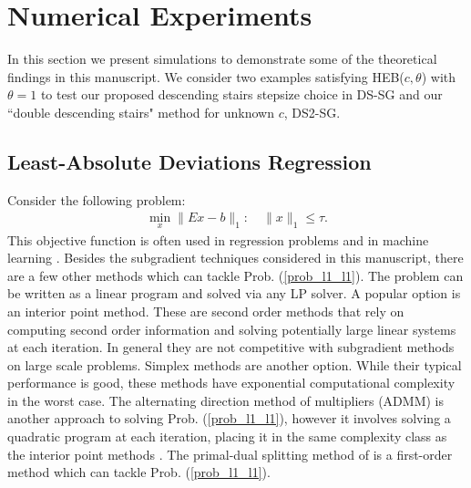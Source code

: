 \section{Numerical Experiments}\label{sec_numerical}
In this section we present simulations to demonstrate some of the theoretical findings in this manuscript. We consider two examples satisfying HEB($c,\theta$) with $\theta=1$ to test our proposed descending stairs stepsize choice in DS-SG and our ``double descending stairs" method for unknown $c$, DS2-SG. 
\subsection{Least-Absolute Deviations Regression}
Consider the following problem:
\begin{eqnarray}\label{prob_l1_l1}
\min_x \|Ex-b\|_1:\quad\|x\|_1\leq\tau.
\end{eqnarray}
This objective function is often used in regression problems and in machine learning \cite{hastie2009elements,wang2006regularized,wang2013l1,gao2010asymptotic}. 
Besides the subgradient techniques considered in this manuscript, there are a few other methods which can tackle Prob. (\ref{prob_l1_l1}). The problem can be written as a linear program and solved via any LP solver. A popular option is an interior point method. These are second order methods that rely on computing second order information and solving potentially large linear systems at each iteration. In general they are not competitive with subgradient methods on large scale problems. Simplex methods \cite{barrodale1973improved} are another option. While their typical performance is good, these methods have exponential computational complexity in the worst case. The alternating direction method of multipliers (ADMM) is another approach to solving Prob. (\ref{prob_l1_l1}), however it involves solving a quadratic program at each iteration, placing it in the same complexity class as the interior point methods \cite{eckstein2012augmented}. The primal-dual splitting method of \cite{chambolle2011first} is a first-order method which can tackle Prob. (\ref{prob_l1_l1}). 
